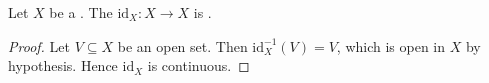 \begin{proposition} \label{proposition:identity_function_is_continuous_between_topological_spaces}
    Let $X$ be a . The  $\mathrm{id}_X : X \to X$ is .
\end{proposition}
\begin{proof}
    Let $V \subseteq X$ be an open set. Then $\mathrm{id}_X^{-1}(V) = V$, which is open in $X$ by hypothesis. Hence $\mathrm{id}_X$ is continuous.
\end{proof}